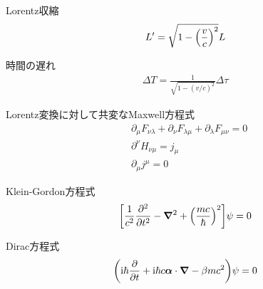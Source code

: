 \documentclass{report}
\begin{document}
  \begin{itembox}[l]{Lorentz収縮}
    \begin{align*}
      L' = \sqrt{1 - \qty(\frac{v}{c})^2}L
    \end{align*}
  \end{itembox}
  \begin{itembox}[l]{時間の遅れ}
    \begin{align*}
      \Delta T = \frac{1}{\sqrt{1 - (v/c)^2}} \Delta \tau
    \end{align*}
  \end{itembox}
  \begin{itembox}[l]{Lorentz変換に対して共変なMaxwell方程式}
    \begin{align*}
      &\partial_\mu F_{\nu\lambda} + \partial_\nu F_{\lambda\mu} + \partial_\lambda F_{\mu\nu} = 0\\
      &\partial^{\nu}H_{\nu\mu}=j_\mu\\
      &\partial_\mu j^\mu = 0
    \end{align*}
  \end{itembox}
  \begin{itembox}[l]{Klein-Gordon方程式}
    \begin{align*}
      \qty[\frac{1}{c^2}\frac{\partial^2}{\partial t^2} - \grad^2 + \qty(\frac{mc}{\hbar})^2]\psi = 0
    \end{align*}
  \end{itembox}
  \begin{itembox}[l]{Dirac方程式}
    \begin{align*}
      \qty(\mathrm{i}\hbar \frac{\partial}{\partial t} + \mathrm{i} \hbar c \bm{\alpha}\cdot \grad - \beta mc^2)\psi = 0
    \end{align*}
  \end{itembox}
\end{document}
